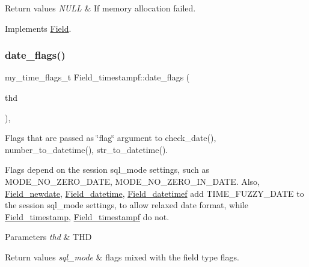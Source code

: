 \begin{DoxyRetVals}{Return values}
{\em N\+U\+LL} & If memory allocation failed. \\
\hline
\end{DoxyRetVals}


Implements \mbox{\hyperlink{classField_a01a9a9aa3a618941e839b1b8793c969d}{Field}}.

\mbox{\label{classField__timestampf_a68ee4c735131162fc015b789c89dba64}} 
\subsubsection{\texorpdfstring{date\+\_\+flags()}{date\_flags()}}
{\footnotesize\ttfamily my\+\_\+time\+\_\+flags\+\_\+t Field\+\_\+timestampf\+::date\+\_\+flags (\begin{DoxyParamCaption}\item[{const T\+HD $\ast$}]{thd }\end{DoxyParamCaption})\hspace{0.3cm}{\ttfamily [protected]}, {\ttfamily [virtual]}}

Flags that are passed as \char`\"{}flag\char`\"{} argument to check\+\_\+date(), number\+\_\+to\+\_\+datetime(), str\+\_\+to\+\_\+datetime().

Flags depend on the session sql\+\_\+mode settings, such as M\+O\+D\+E\+\_\+\+N\+O\+\_\+\+Z\+E\+R\+O\+\_\+\+D\+A\+TE, M\+O\+D\+E\+\_\+\+N\+O\+\_\+\+Z\+E\+R\+O\+\_\+\+I\+N\+\_\+\+D\+A\+TE. Also, \mbox{\hyperlink{classField__newdate}{Field\+\_\+newdate}}, \mbox{\hyperlink{classField__datetime}{Field\+\_\+datetime}}, \mbox{\hyperlink{classField__datetimef}{Field\+\_\+datetimef}} add T\+I\+M\+E\+\_\+\+F\+U\+Z\+Z\+Y\+\_\+\+D\+A\+TE to the session sql\+\_\+mode settings, to allow relaxed date format, while \mbox{\hyperlink{classField__timestamp}{Field\+\_\+timestamp}}, \mbox{\hyperlink{classField__timestampf}{Field\+\_\+timestampf}} do not.


\begin{DoxyParams}{Parameters}
{\em thd} & T\+HD \\
\hline
\end{DoxyParams}

\begin{DoxyRetVals}{Return values}
{\em sql\+\_\+mode} & flags mixed with the field type flags. \\
\hline
\end{DoxyRetVals}


